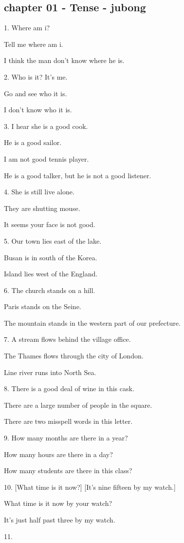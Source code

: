 \subsection{chapter 01 - Tense - jubong}\label{chapter01-jubong}

1. Where am i?

Tell me where am i.

I think the man don't know where he is.
\vspace{1pc}

2. Who is it? It's me.

Go and see who it is.

I don't know who it is.
\vspace{1pc}

3. I hear she is a good cook.

He is a good sailor.

I am not good tennis player.

He is a good talker, but he is not a good listener.
\vspace{1pc}

4. She is still live alone.

They are shutting mouse.

It seems your face is not good.
\vspace{1pc}

5. Our town lies east of the lake.

Busan is in south of the Korea.

Island lies west of the England.
\vspace{1pc}

6. The church stands on a hill.

Paris stands on the Seine.

The mountain stands in the western part of our prefecture.
\vspace{1pc}

7. A stream flows behind the village office.

The Thames flows through the city of London.

Line river runs into North Sea.
\vspace{1pc}

8. There is a good deal of wine in this cask.

There are a large number of people in the square.

There are two misspell words in this letter.
\vspace{1pc}

9. How many months are there in a year?

How many hours are there in a day?

How many students are there in this class?
\vspace{1pc}

10. [What time is it now?] [It's nine fifteen by my watch.]

What time is it now by your watch?

It's just half past three by my watch.
\vspace{1pc}

11. 


